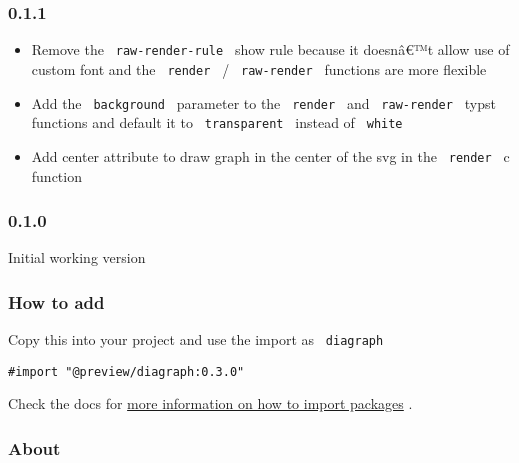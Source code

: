 \subsubsection{0.1.1}\label{section-8}

\begin{itemize}
\tightlist
\item
  Remove the \texttt{\ raw-render-rule\ } show rule because it doesnâ€™t
  allow use of custom font and the \texttt{\ render\ } /
  \texttt{\ raw-render\ } functions are more flexible
\item
  Add the \texttt{\ background\ } parameter to the \texttt{\ render\ }
  and \texttt{\ raw-render\ } typst functions and default it to
  \texttt{\ transparent\ } instead of \texttt{\ white\ }
\item
  Add center attribute to draw graph in the center of the svg in the
  \texttt{\ render\ } c function
\end{itemize}

\subsubsection{0.1.0}\label{section-9}

Initial working version

\subsubsection{How to add}\label{how-to-add}

Copy this into your project and use the import as \texttt{\ diagraph\ }

\begin{verbatim}
#import "@preview/diagraph:0.3.0"
\end{verbatim}



Check the docs for
\href{https://typst.app/docs/reference/scripting/\#packages}{more
information on how to import packages} .

\subsubsection{About}\label{about}

